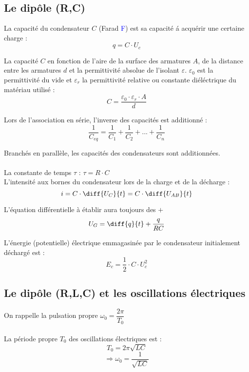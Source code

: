 \documentclass[../MAIN/main.tex]{subfiles}
\begin{document}
\subsection{Le dipôle (R,C)}
\begin{Definition}
La capacité du condensateur $C$ (Farad \textcolor{blue}{F}) est sa capacité á acquérir une certaine charge :
$$q = C \cdot U_{c}$$

La capacité $C$ en fonction de l'aire de la surface des armatures $A$, de la distance entre les armatures $d$ et la permittivité absolue de l'isolant $\varepsilon$. $\varepsilon_{0}$ est la permittivité du vide et $\varepsilon_{r}$ la permittivité relative ou constante diéléctrique du matériau utilisé :
$$C = \dfrac{\varepsilon_{0} \cdot \varepsilon_{r} \cdot A}{d}$$

Lors de l'association en série, l'inverse des capacités est additionné :
$$\dfrac{1}{C_{eq}} = \dfrac{1}{C_{1}} + \dfrac{1}{C_{2}} + ... + \dfrac{1}{C_{n}}$$

Branchés en parallèle, les capacités des condensateurs sont additionnées.\\\\

La constante de temps $\tau$ : \qquad $\tau = R \cdot C$\\

L'intensité aux bornes du condensateur lors de la charge et de la décharge : 
$$i = C \cdot \diff{U_{C}}{t} = C \cdot \diff{U_{AB}}{t}$$

L'équation différentielle à établir aura toujours des $+$ 
$$U_{G}  = \diff{q}{t} + \dfrac{q}{RC} $$

L'énergie (potentielle) électrique emmagasinée par le condensateur initialement déchargé est :
$$E_{c} = \dfrac{1}{2} \cdot C \cdot U_{c}^2$$

\end{Definition}


\subsection{Le dipôle (R,L,C) et les oscillations électriques}
\begin{Definition}
On rappelle la pulsation propre $\omega_{0} = \dfrac{2\pi}{T_{0}} $\\\\

La période propre $T_{0}$ des oscillations électriques est :
$$T_{0} = 2 \pi \sqrt{LC}$$
$$\Rightarrow \omega_{0} = \dfrac{1}{\sqrt{LC}}$$

\end{Definition}
\end{document}
